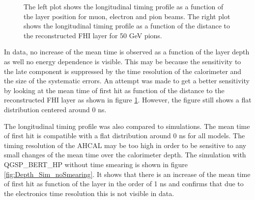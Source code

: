 \begin{figure}[htbp!]
\begin{subfigure}[t]{0.5\textwidth}
		\caption{}\label{fig:Depth_Comparison_FHI}
	\end{subfigure}
	\caption{The left plot shows the longitudinal timing profile as a function of the layer position for muon, electron and pion beams. The right plot shows the longitudinal timing profile as a function of the distance to the reconstructed FHI layer for 50 GeV pions.}
	\label{fig:DepthProfile}
\end{figure}

In data, no increase of the mean time is observed as a function of the layer depth as well no energy dependence is visible. This may be because the sensitivity to the late component is suppressed by the time resolution of the calorimeter and the size of the systematic errors. An attempt was made to get a better sensitivity by looking at the mean time of first hit as function of the distance to the reconstructed FHI layer as shown in figure \ref{fig:Depth_Comparison_FHI}. However, the figure still shows a flat distribution centered around 0 ns.

The longitudinal timing profile was also compared to simulations. The mean time of first hit is compatible with a flat distribution around 0 ns for all models. The timing resolution of the AHCAL may be too high in order to be sensitive to any small changes of the mean time over the calorimeter depth. The simulation with QGSP\_BERT\_HP without time smearing is shown in figure \ref{fig:Depth_Sim_noSmearing}. It shows that there is an increase of the mean time of first hit as function of the layer in the order of 1 ns and confirms that due to the electronics time resolution this is not visible in data.

